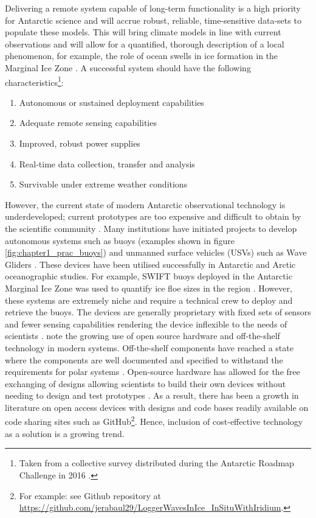 Delivering a remote system capable of long-term functionality is a high priority for Antarctic science \cite{kennicutt2016delivering} and will accrue robust, reliable, time-sensitive data-sets to populate these models. This will bring climate models in line with current observations and will allow for a quantified, thorough description of a local phenomenon, for example, the role of ocean swells in ice formation in the Marginal Ice Zone \cite{doble2013wave}. A successful system should have the following characteristics\footnote{Taken from a collective survey distributed during the Antarctic Roadmap Challenge in 2016 \cite{kennicutt2016delivering}.}: 
\begin{enumerate}

    \item Autonomous or sustained deployment capabilities
    \item Adequate remote sensing capabilities
    \item Improved, robust power supplies
    \item Real-time data collection, transfer and analysis
    \item Survivable under extreme weather conditions
\end{enumerate}

However, the current state of  modern Antarctic observational technology is underdeveloped; current prototypes are too expensive and difficult to obtain by the scientific community \cite{kennicutt2016delivering}. Many institutions have initiated projects to develop autonomous systems such as buoys (examples shown in figure \ref{fig:chapter1_prac_buoys}) and unmanned surface vehicles (USVs) such as Wave Gliders \cite{liquidrobot2016wave,swart2020submesoscale}. These devices have been utilised successfully in Antarctic and Arctic oceanographic studies. For example, SWIFT buoys deployed in the Antarctic Marginal Ice Zone was used to quantify ice floe sizes in the region \cite{alberello2019brief}. However, these systems are extremely niche and require a technical crew to deploy and retrieve the buoys. The devices are generally proprietary with fixed sets of sensors and fewer sensing capabilities rendering the device inflexible to the needs of scientists \cite{rabault2017measurements}. \textcite{rabault2019open} note the growing use of open source hardware and off-the-shelf technology in modern systems. Off-the-shelf  components have reached a state where the components are well documented and specified to withstand the requirements for polar systems \cite{rabault2019open}. Open-source hardware has allowed for the free exchanging of designs allowing scientists to build their own devices without needing to design and test prototypes \cite{rabault2019open}. As a result, there has been a growth in literature on open access devices with designs and code bases readily available on code sharing sites such as GitHub\footnote{For example: see \textcite{rabault2019open} Github repository at \url{https://github.com/jerabaul29/LoggerWavesInIce_InSituWithIridium}.}. Hence, inclusion of cost-effective technology as a solution is a growing trend. \par 


